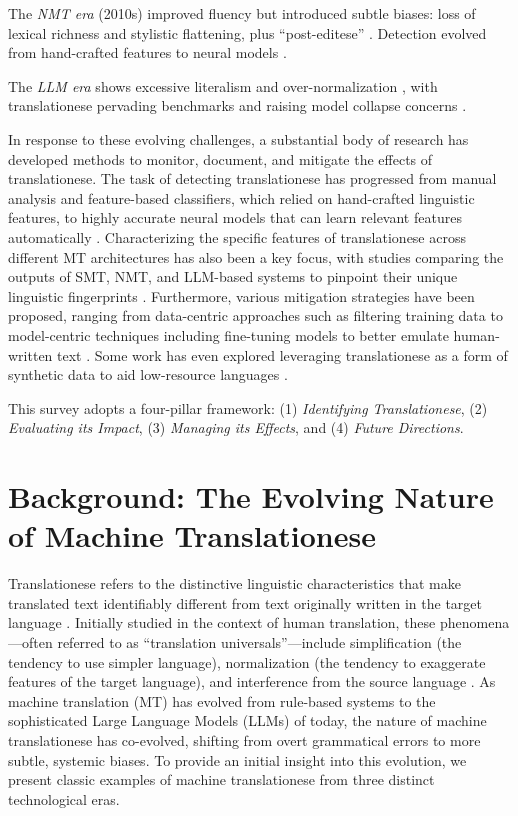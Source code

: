 \documentclass[11pt,a4paper]{article}
\begin{document}
The \textit{NMT era} (2010s) improved fluency but introduced subtle biases: loss of lexical richness \cite{vanmassenhove2018getting} and stylistic flattening, plus ``post-editese'' \cite{toral2019post}. Detection evolved from hand-crafted features to neural models \cite{pylypenko2021comparing,amponsah2022explaining}.

The \textit{LLM era} shows excessive literalism and over-normalization \cite{wang2024benchmarking}, with translationese pervading benchmarks \cite{church2025emerging} and raising model collapse concerns \cite{shumailov2024ai}.

In response to these evolving challenges, a substantial body of research has developed methods to monitor, document, and mitigate the effects of translationese. The task of detecting translationese has progressed from manual analysis and feature-based classifiers, which relied on hand-crafted linguistic features, to highly accurate neural models that can learn relevant features automatically \cite{pylypenko2021comparing,amponsah2022explaining}. Characterizing the specific features of translationese across different MT architectures has also been a key focus, with studies comparing the outputs of SMT, NMT, and LLM-based systems to pinpoint their unique linguistic fingerprints \cite{riley2020translationese}. Furthermore, various mitigation strategies have been proposed, ranging from data-centric approaches such as filtering training data \cite{lembersky2013improving} to model-centric techniques including fine-tuning models to better emulate human-written text \cite{jourdan2025translationese}. Some work has even explored leveraging translationese as a form of synthetic data to aid low-resource languages \cite{dabre2024pretraining}.

This survey adopts a four-pillar framework: (1) \textit{Identifying Translationese}, (2) \textit{Evaluating its Impact}, (3) \textit{Managing its Effects}, and (4) \textit{Future Directions}.

\section{Background: The Evolving Nature of Machine Translationese}

Translationese refers to the distinctive linguistic characteristics that make translated text identifiably different from text originally written in the target language \cite{gellerstam1986translationese}. Initially studied in the context of human translation, these phenomena---often referred to as ``translation universals''---include simplification (the tendency to use simpler language), normalization (the tendency to exaggerate features of the target language), and interference from the source language \cite{baker1993corpus}. As machine translation (MT) has evolved from rule-based systems to the sophisticated Large Language Models (LLMs) of today, the nature of machine translationese has co-evolved, shifting from overt grammatical errors to more subtle, systemic biases. To provide an initial insight into this evolution, we present classic examples of machine translationese from three distinct technological eras.
\end{document}
